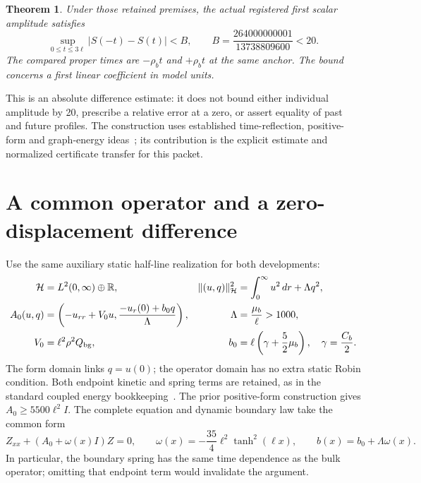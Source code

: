 \documentclass[10pt]{article}
\newtheorem{theorem}{Theorem}
\newcommand{\Hh}{\mathcal H}
\newcommand{\norm}[1]{\lVert#1\rVert}
\begin{document}
\begin{theorem}\label{thm:main}
Under those retained premises, the actual registered first scalar amplitude
satisfies
\begin{equation}\label{eq:main}
 \sup_{0\le t\le3\ell}|S(-t)-S(t)|<B,
 \qquad B=\frac{264000000001}{13738809600}<20.
\end{equation}
The compared proper times are \(-\rho_b t\) and \(+\rho_b t\) at the same
anchor. The bound concerns a first linear coefficient in model units.
\end{theorem}

This is an absolute difference estimate: it does not bound either individual
amplitude by 20, prescribe a relative error at a zero, or assert equality of
past and future profiles. The construction uses established time-reflection,
positive-form and graph-energy ideas~\cite{zahn,marta}; its contribution is
the explicit estimate and normalized certificate transfer for this packet.

\section{A common operator and a zero-displacement difference}

Use the same auxiliary static half-line realization for both developments:
\begin{align}
 \Hh&=L^2(0,\infty)\oplus\mathbb R,
 &\norm{(u,q)}_{\Hh}^2&=\int_0^\infty u^2\,dr+\Lambda q^2,\label{eq:space}\\
 A_0(u,q)&=\left(-u_{rr}+V_0u,\frac{-u_r(0)+b_0q}{\Lambda}\right),
 &\Lambda&=\frac{\mu_b}{\ell}>1000,\label{eq:operator}\\
 V_0&=\ell^2\rho^2Q_{\rm bg},
 &b_0&=\ell\left(\gamma+\frac52\mu_b\right),\quad\gamma=\frac{C_b}{2}.
 \nonumber
\end{align}
The form domain links \(q=u(0)\); the operator domain has no extra static
Robin condition. Both endpoint kinetic and spring terms are retained,
as in the standard coupled energy bookkeeping~\cite{dahmani}.
The prior positive-form construction gives \(A_0\ge5500\ell^2 I\).
The complete equation and dynamic boundary law take the common form
\begin{equation}\label{eq:wave}
 Z_{xx}+(A_0+\omega(x)I)Z=0,\qquad
 \omega(x)=-\frac{35}{4}\ell^2\tanh^2(\ell x),\qquad
 b(x)=b_0+\Lambda\omega(x).
\end{equation}
In particular, the boundary spring has the same time dependence as the bulk
operator; omitting that endpoint term would invalidate the argument.
\end{document}
